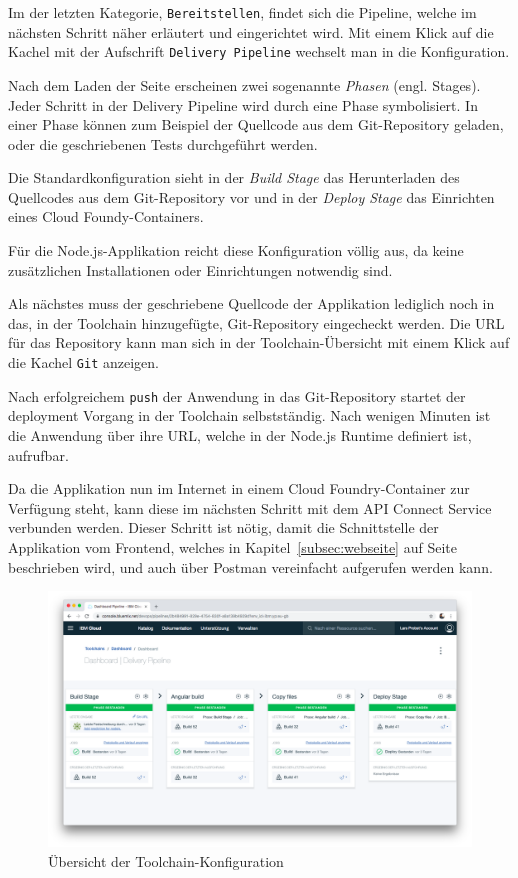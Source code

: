 Im der letzten Kategorie, \texttt{Bereitstellen}, findet sich die Pipeline, welche im nächsten Schritt näher erläutert
und eingerichtet wird. Mit einem Klick auf die Kachel mit der Aufschrift \texttt{Delivery Pipeline} wechselt man in die
Konfiguration.

Nach dem Laden der Seite erscheinen zwei sogenannte \textit{Phasen} (engl. Stages). Jeder Schritt in der Delivery Pipeline
wird durch eine Phase symbolisiert. In einer Phase können zum Beispiel der Quellcode aus dem Git-Repository geladen, oder
die geschriebenen Tests durchgeführt werden.

Die Standardkonfiguration sieht in der \textit{Build Stage} das Herunterladen des Quellcodes aus dem Git-Repository vor
und in der \textit{Deploy Stage} das Einrichten eines Cloud Foundy-Containers.

Für die Node.js-Applikation reicht diese Konfiguration völlig aus, da keine zusätzlichen Installationen oder Einrichtungen
notwendig sind.

Als nächstes muss der geschriebene Quellcode der Applikation lediglich noch in das, in der Toolchain hinzugefügte,
Git-Repository eingecheckt werden. Die URL für das Repository kann man sich in der Toolchain-Übersicht mit einem Klick
auf die Kachel \texttt{Git} anzeigen.

Nach erfolgreichem \texttt{push} der Anwendung in das Git-Repository startet der deployment Vorgang in der Toolchain
selbstständig. Nach wenigen Minuten ist die Anwendung über ihre URL, welche in der Node.js Runtime definiert ist,
aufrufbar.

Da die Applikation nun im Internet in einem Cloud Foundry-Container zur Verfügung steht, kann diese im nächsten Schritt
mit dem API Connect Service verbunden werden. Dieser Schritt ist nötig, damit die Schnittstelle der Applikation vom
Frontend, welches in Kapitel~\ref{subsec:webseite} auf Seite~\pageref{subsec:webseite} beschrieben wird, und auch über
Postman vereinfacht aufgerufen werden kann.

\begin{figure}[h]
    \centering
    \includegraphics[scale=0.26]{images/kapitel_3/toolchain_pipeline.png}
    \caption{Übersicht der Toolchain-Konfiguration}
    \label{fig:umsetzung_toolchain_pipeline}
\end{figure}

